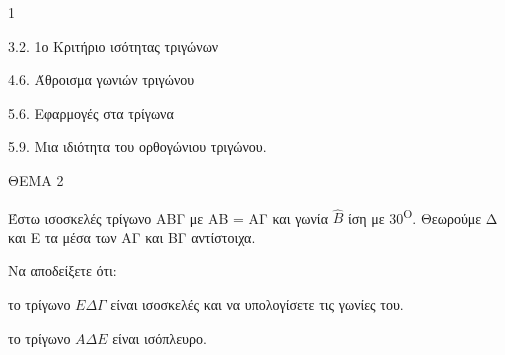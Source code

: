 \begin{ylh}{1}
    \item 3.2. 1ο Κριτήριο ισότητας τριγώνων
    \item 4.6. Άθροισμα γωνιών τριγώνου
    \item 5.6. Εφαρμογές στα τρίγωνα
    \item 5.9. Μια ιδιότητα του ορθογώνιου τριγώνου.
\end{ylh}

ΘΕΜΑ 2

Έστω ισοσκελές τρίγωνο ΑΒΓ με ΑΒ = ΑΓ και γωνία $\widehat{Β}$ ίση με 30\textsuperscript{Ο}. Θεωρούμε Δ και Ε τα μέσα των ΑΓ και ΒΓ αντίστοιχα.

Να αποδείξετε ότι:

\begin{alist}
\item το τρίγωνο $E\Delta\Gamma$ είναι ισοσκελές και να υπολογίσετε τις γωνίες του. 
\item το τρίγωνο $A\Delta E$ είναι ισόπλευρο. 

\begin{center}
\end{center}
\end{alist}

